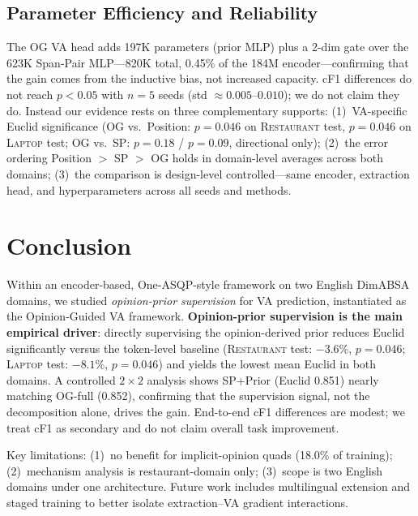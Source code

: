 \documentclass[runningheads]{llncs}
\newcommand{\restaurant}{{\normalfont\textsc{Restaurant}}}
\newcommand{\laptop}{{\normalfont\textsc{Laptop}}}
\begin{document}
\subsection{Parameter Efficiency and Reliability}
\label{sec:efficiency}

The OG VA head adds 197K parameters (prior MLP) plus a 2-dim gate over the 623K Span-Pair MLP---820K total, 0.45\% of the 184M encoder---confirming that the gain comes from the inductive bias, not increased capacity. cF1 differences do not reach $p < 0.05$ with $n = 5$ seeds (std $\approx 0.005\text{--}0.010$); we do not claim they do. Instead our evidence rests on three complementary supports: (1)~VA-specific Euclid significance (OG vs.\ Position: $p = 0.046$ on \restaurant{} test, $p = 0.046$ on \laptop{} test; OG vs.\ SP: $p = 0.18$ / $p = 0.09$, directional only); (2)~the error ordering Position $>$ SP $>$ OG holds in domain-level averages across both domains; (3)~the comparison is design-level controlled---same encoder, extraction head, and hyperparameters across all seeds and methods.

\section{Conclusion}
\label{sec:conclusion}

Within an encoder-based, One-ASQP-style framework on two English DimABSA domains, we studied \emph{opinion-prior supervision} for VA prediction, instantiated as the Opinion-Guided VA framework. \textbf{Opinion-prior supervision is the main empirical driver}: directly supervising the opinion-derived prior reduces Euclid significantly versus the token-level baseline (\restaurant{} test: $-3.6\%$, $p = 0.046$; \laptop{} test: $-8.1\%$, $p = 0.046$) and yields the lowest mean Euclid in both domains. A controlled $2\!\times\!2$ analysis shows SP+Prior (Euclid 0.851) nearly matching OG-full (0.852), confirming that the supervision signal, not the decomposition alone, drives the gain. End-to-end cF1 differences are modest; we treat cF1 as secondary and do not claim overall task improvement.

Key limitations: (1)~no benefit for implicit-opinion quads (18.0\% of training); (2)~mechanism analysis is restaurant-domain only; (3)~scope is two English domains under one architecture. Future work includes multilingual extension and staged training to better isolate extraction--VA gradient interactions.



\end{document}
